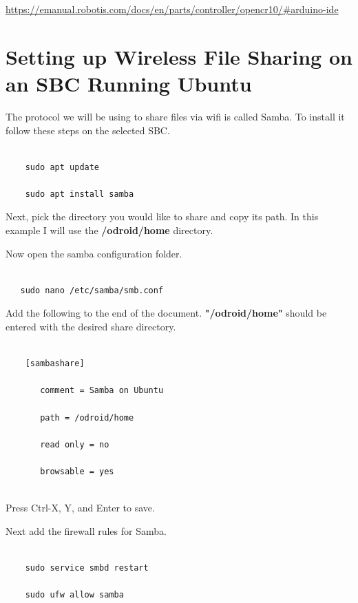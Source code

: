 \documentclass[12]{article}
\begin{document}
\url {https://emanual.robotis.com/docs/en/parts/controller/opencr10/#arduino-ide}
\newpage
\section{Setting up Wireless File Sharing on an SBC Running Ubuntu}


The protocol we will be using to share files via wifi is called Samba. To install it follow these steps on the selected SBC.


\begin{lstlisting}

    sudo apt update

    sudo apt install samba

\end{lstlisting}


Next, pick the directory you would like to share and copy its path. In this example I will use the \textbf{/odroid/home} directory.

Now open the samba configuration folder. 


\begin{lstlisting}

   sudo nano /etc/samba/smb.conf

\end{lstlisting}


Add the following to the end of the document. \textbf{"/odroid/home"} should be entered with the desired share directory.


\begin{lstlisting}

    [sambashare]

       comment = Samba on Ubuntu

       path = /odroid/home

       read only = no

       browsable = yes


\end{lstlisting}


Press Ctrl-X, Y, and Enter to save.

Next add the firewall rules for Samba.



\begin{lstlisting}

    sudo service smbd restart

    sudo ufw allow samba


\end{lstlisting}
\end{document}
